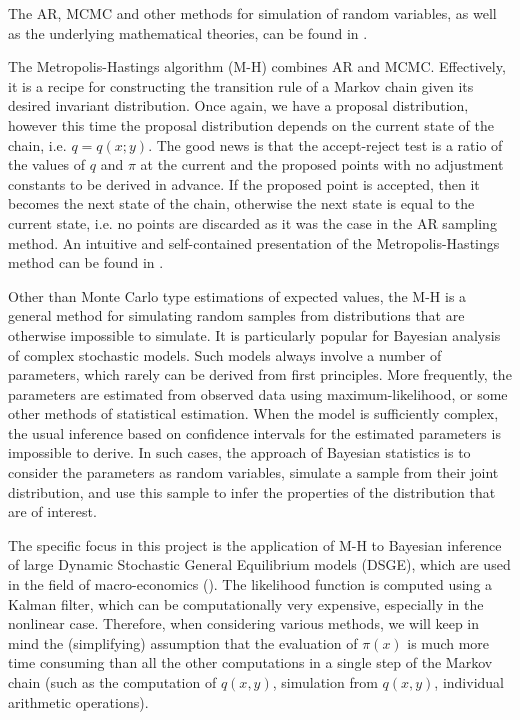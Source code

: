 \documentclass[11pt,letterpaper]{article}       %
\begin{document}
The AR, MCMC and other methods for simulation of random variables, as well as
the underlying mathematical theories, can be found in \cite{ross.simulation}.


The Metropolis-Hastings algorithm (M-H) combines AR and MCMC.  Effectively, it
is a recipe for constructing the transition rule of a Markov chain given its
desired invariant distribution.  Once again, we have a proposal distribution,
however this time the proposal distribution depends on the current state of the
chain, i.e. $q=q(x;y)$. The good news is that the accept-reject test is a ratio
of the values of $q$ and $\pi$ at the current and the proposed points with no
adjustment constants to be derived in advance.  If the proposed point is
accepted, then it becomes the next state of the chain, otherwise the next state
is equal to the current state, i.e. no points are discarded as it was the case
in the AR sampling method.  An intuitive and self-contained presentation of the
Metropolis-Hastings method can be found in \cite{understanding.MH}.

Other than Monte Carlo type estimations of expected values, the M-H is a
general method for simulating random samples from distributions that are
otherwise impossible to simulate.  It is particularly popular for Bayesian
analysis of complex stochastic models.  Such models always involve a number of
parameters, which rarely can be derived from first principles.  More
frequently, the parameters are estimated from observed data using
maximum-likelihood, or some other methods of statistical estimation.  When the
model is sufficiently complex, the usual inference based on confidence
intervals for the estimated parameters is impossible to derive.  In such cases,
the approach of Bayesian statistics is to consider the parameters as random
variables,  simulate a sample from their joint distribution, and use this
sample to infer the properties of the distribution that are of interest.

The specific focus in this project is the application of M-H to Bayesian
inference of large Dynamic Stochastic General Equilibrium models (DSGE), which
are used in the field of macro-economics (\cite{strid2010adaptive}).  The
likelihood function is computed using a Kalman filter, which can be
computationally very expensive, especially in the nonlinear case.  Therefore,
when considering various methods, we will keep in mind the (simplifying)
assumption that the evaluation of $\pi(x)$ is much more time consuming than all
the other computations in a single step of the Markov chain (such as the
computation of $q(x,y)$, simulation from $q(x,y)$, individual arithmetic
operations). 
\end{document}
